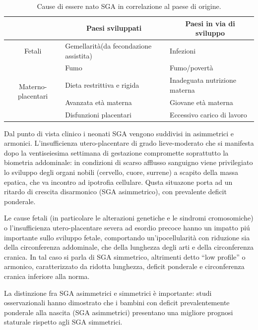 \begin{table}[h]\centering
\begin{tabular}{cll}
\toprule
			& \multicolumn{1}{c}{Paesi sviluppati}			& \multicolumn{1}{c}{Paesi in via di sviluppo} \\
\midrule
Fetali & Gemellarit\`a(da fecondazione assistita) 			& Infezioni			\\\midrule
\multirow{4}{*}{Materno-placentari} & Fumo						& Fumo/povertà		\\\cmidrule(l){2-3}
			& Dieta restrittiva e rigida	& Inadeguata nutrizione materna	\\\cmidrule(l){2-3}
			& Avanzata età materna  &	Giovane età materna \\\cmidrule(l){2-3}
			& Disfunzioni placentari	& Eccessivo carico di lavoro	\\\bottomrule
\end{tabular}
\label{tab-cause}
\caption{Cause di essere nato SGA in correlazione al paese di origine.}
\end{table}


  
Dal punto di vista clinico i neonati SGA vengono suddivisi in asimmetrici e armonici.
L'insufficienza utero-placentare di grado lieve-moderato che si manifesta dopo la 
ventiseiesima settimana di gestazione compromette soprattutto la biometria addominale: 
in condizioni di scarso afflusso sanguigno viene privilegiato lo sviluppo degli 
organi nobili (cervello, cuore, surrene) a scapito della massa epatica, che va incontro ad ipotrofia cellulare. 
Qusta situazone porta ad un ritardo di crescita disarmonico (SGA asimmetrico), con prevalente deficit ponderale.


Le cause fetali (in particolare le alterazioni genetiche e le sindromi cromosomiche) o l'insufficienza utero-placentare severa ad esordio 
precoce hanno un impatto pi\'u importante sullo sviluppo fetale, comportando un'ipocellularità con 
riduzione sia della circonferenza addominale, che della lunghezza degli arti e 
della circonferenza cranica. In tal caso si parla di SGA simmetrico, altrimenti detto "`low profile"' o armonico, caratterizzato da ridotta lunghezza, deficit ponderale e circonferenza cranica inferiore alla norma.


La distinzione fra SGA asimmetrici e simmetrici \`e importante: studi osservazionali 
hanno dimostrato che i bambini con deficit prevalentemente ponderale alla nascita 
(SGA asimmetrici) presentano una migliore prognosi staturale rispetto agli SGA simmetrici.\cite{sga-10}

